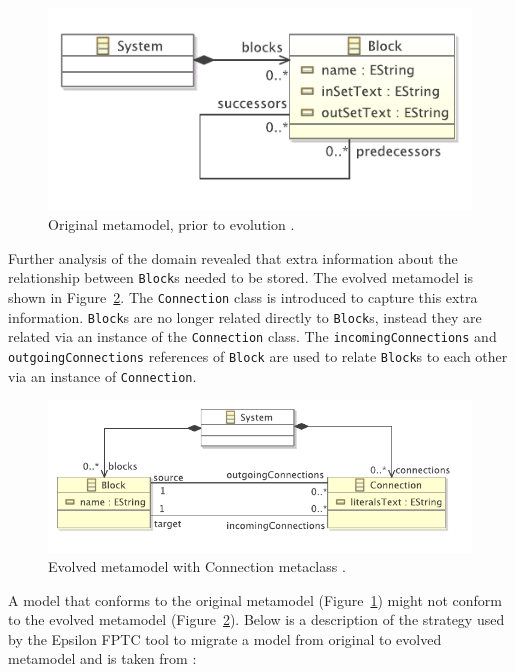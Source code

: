 \begin{figure}[htbp]
  \centering
  \includegraphics[scale=0.75]{4.Analysis/fptc_before.pdf}
  \caption{Original metamodel, prior to evolution \cite{rose09analysis}.}
  \label{fig:mm_before}
\end{figure}

Further analysis of the domain revealed that extra information about the relationship between \texttt{Block}s needed to be stored. The evolved metamodel is shown in Figure~\ref{fig:mm_after}. The \texttt{Connection} class is introduced to capture this extra information. \texttt{Block}s are no longer related directly to \texttt{Block}s, instead they are related via an instance of the \texttt{Connection} class. The \texttt{incomingConnections} and \texttt{outgoingConnections} references of \texttt{Block} are used to relate \texttt{Block}s to each other via an instance of \texttt{Connection}.

\begin{figure}[htbp]
  \centering
  \includegraphics[scale=0.75]{4.Analysis/fptc_after.pdf}
  \caption{Evolved metamodel with Connection metaclass \cite{rose09analysis}.}
  \label{fig:mm_after}
\end{figure}

A model that conforms to the original metamodel (Figure~\ref{fig:mm_before}) might not conform to the evolved metamodel (Figure~\ref{fig:mm_after}). Below is a description of the strategy used by the Epsilon FPTC tool to migrate a model from original to evolved metamodel and is taken from \cite{rose09analysis}:

